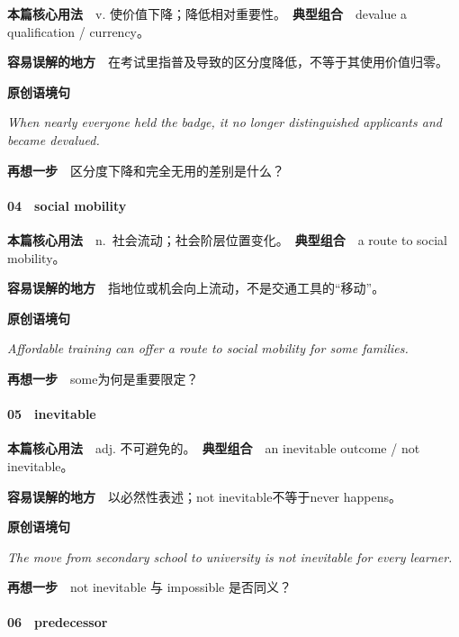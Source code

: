 \documentclass[
  11pt,
]{ctexart}
\renewenvironment{quote}{\begin{tcolorbox}[enhanced,breakable,colback=sand,colframe=primary!22,boxrule=0.4pt,arc=2pt,left=2.6mm,right=2.6mm,top=1.6mm,bottom=1.6mm]\itshape}{\end{tcolorbox}}
\begin{document}
\textbf{本篇核心用法}　v.
使价值下降；降低相对重要性。　\textbf{典型组合}　devalue a qualification
/ currency。

\textbf{容易误解的地方}　在考试里指普及导致的区分度降低，不等于其使用价值归零。

\textbf{原创语境句}

\begin{quote}
When nearly everyone held the badge, it no longer distinguished
applicants and became devalued.
\end{quote}

\textbf{再想一步}　区分度下降和完全无用的差别是什么？

\paragraph{04　social mobility}\label{social-mobility}

\textbf{本篇核心用法}　n.~社会流动；社会阶层位置变化。　\textbf{典型组合}　a
route to social mobility。

\textbf{容易误解的地方}　指地位或机会向上流动，不是交通工具的``移动''。

\textbf{原创语境句}

\begin{quote}
Affordable training can offer a route to social mobility for some
families.
\end{quote}

\textbf{再想一步}　some为何是重要限定？

\paragraph{05　inevitable}\label{inevitable}

\textbf{本篇核心用法}　adj. 不可避免的。　\textbf{典型组合}　an
inevitable outcome / not inevitable。

\textbf{容易误解的地方}　以必然性表述；not inevitable不等于never
happens。

\textbf{原创语境句}

\begin{quote}
The move from secondary school to university is not inevitable for every
learner.
\end{quote}

\textbf{再想一步}　not inevitable 与 impossible 是否同义？

\paragraph{06　predecessor}\label{predecessor}
\end{document}

